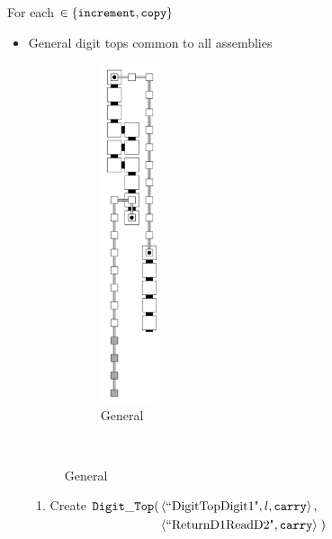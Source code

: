         For each {\inc} $\in \{ {\tt increment, copy } \}$
        \begin{itemize}
            \item General digit tops common to all assemblies

            \begin{figure}[H]
                \centering
                \begin{subfigure}[t]{0.2\textwidth}
                    \centering
                    \includegraphics[width=0.2\textwidth]{warping/digit_top_general}
                    \caption{\label{fig:warping/digit_top_general} General }
                \end{subfigure}%
                ~
            \end{figure}

            \begin{enumerate}[label={--}]
                \item Create
                $\begin{aligned}[t]
                    {\tt Digit\_Top}(& \left \langle \text{``DigitTopDigit1"}, l, {\tt carry} \right\rangle, & \\
                          & \left \langle \text{``ReturnD1ReadD2"},    {\tt carry} \right\rangle \;)
                \end{aligned}$
                \vspace{.5cm}


\end{enumerate}
\end{itemize}
